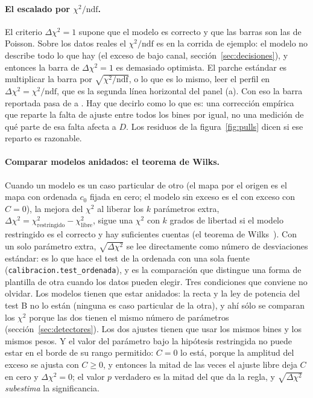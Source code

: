 \documentclass[11pt,a4paper]{article}
\begin{document}
\paragraph{El escalado por $\chi^2/\text{ndf}$.} El criterio
$\Delta\chi^2 = 1$ supone que el modelo es correcto y que las barras son las
de Poisson. Sobre los datos reales el $\chi^2/\text{ndf}$ es \EjChiNdf{} en
la corrida de ejemplo: el modelo no describe todo lo que hay (el exceso de
bajo canal, sección~\ref{sec:decisiones}), y entonces la barra de
$\Delta\chi^2 = 1$ es demasiado optimista. El parche estándar es multiplicar
la barra por $\sqrt{\chi^2/\text{ndf}}$, o lo que es lo mismo, leer el perfil
en $\Delta\chi^2 = \chi^2/\text{ndf}$, que es la segunda línea horizontal del
panel (a). Con eso la barra reportada pasa de \EjErrCurv{} a
\EjErrEscalado{} \DkeV. Hay que decirlo como lo que es: una corrección
empírica que reparte la falta de ajuste entre todos los bines por igual, no
una medición de qué parte de esa falta afecta a $D$. Los residuos de la
figura~\ref{fig:pulls} dicen si ese reparto es razonable.

\paragraph{Comparar modelos anidados: el teorema de Wilks.} Cuando un modelo
es un caso particular de otro (el mapa por el origen es el mapa con ordenada
$c_0$ fijada en cero; el modelo sin exceso es el con exceso con $C = 0$), la
mejora del $\chi^2$ al liberar los $k$ parámetros extra,
$\Delta\chi^2 = \chi^2_{\text{restringido}} - \chi^2_{\text{libre}}$, sigue una
$\chi^2$ con $k$ grados de libertad si el modelo restringido es el correcto y
hay suficientes cuentas (el teorema de Wilks~\cite{wilks1938}). Con un solo
parámetro extra, $\sqrt{\Delta\chi^2}$ se lee directamente como número de
desviaciones estándar: es lo que hace el test de la ordenada con una sola
fuente (\texttt{calibracion.test\_ordenada}), y es la comparación que
distingue una forma de plantilla de otra cuando los datos pueden elegir.
Tres condiciones que conviene no olvidar. Los modelos tienen que estar
anidados: la recta y la ley de potencia del test B no lo están (ninguna es
caso particular de la otra), y ahí sólo se comparan los $\chi^2$ porque las
dos tienen el mismo número de parámetros (sección~\ref{sec:detectores}). Los
dos ajustes tienen que usar los mismos bines y los mismos pesos. Y el valor
del parámetro bajo la hipótesis restringida no puede estar en el borde de su
rango permitido: $C = 0$ lo está, porque la amplitud del exceso se ajusta con
$C \geq 0$, y entonces la mitad de las veces el ajuste libre deja $C$ en cero
y $\Delta\chi^2 = 0$; el valor $p$ verdadero es la mitad del que da la regla,
y $\sqrt{\Delta\chi^2}$ \emph{subestima} la significancia.
\end{document}
